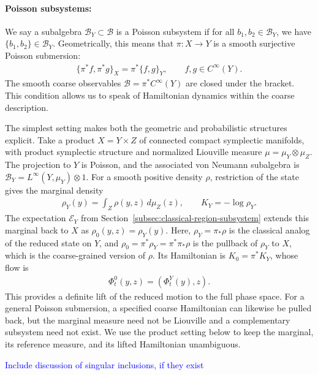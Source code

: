 \documentclass[a4paper,11pt]{article}
\theoremstyle{definition}
\newcommand{\mB}{\mathcal{B}}
\newcommand{\NL}[1]{\textcolor{blue}{#1}}
\newcommand{\mE}{\mathcal{E}}
\begin{document}
\paragraph{Poisson subsystems:} We say a subalgebra $\mB_Y\subset \mB$ is a Poisson subsystem if for all $b_1,b_2\in \mB_Y$, we have $\{b_1,b_2\}\in \mB_Y$. Geometrically, this means that $\pi:X\to Y$ is a smooth surjective Poisson submersion:
\begin{align}\label{eq:classical-Poisson-subsystem}
    \{\pi^*f,\pi^*g\}_X=\pi^*\{f,g\}_Y,
    \qquad f,g\in C^\infty(Y).
\end{align}
The smooth coarse observables $\mathcal B=\pi^*C^\infty(Y)$ are closed under the bracket. This condition allows us to speak of Hamiltonian dynamics within the coarse description.

The simplest setting makes both the geometric and probabilistic structures explicit. Take a product $X=Y\times Z$ of connected compact symplectic manifolds, with product symplectic structure and normalized Liouville measure $\mu=\mu_Y\otimes\mu_Z$. The projection to $Y$ is Poisson, and the associated von Neumann subalgebra is $\mB_Y=L^\infty(Y,\mu_Y)\otimes1$. For a smooth positive density $\rho$, restriction of the state gives the marginal density
\begin{align}\label{eq:classical-marginal-Hamiltonian}
    \rho_Y(y)=\int_Z\rho(y,z)\,d\mu_Z(z),\qquad
    K_Y=-\log\rho_Y.
\end{align}
The expectation $\mE_Y$ from Section~\ref{subsec:classical-region-subsystem} extends this marginal back to $X$ as $\rho_0(y,z)=\rho_Y(y)$. Here, $\rho_Y=\pi_*\rho$ is the classical analog of the reduced state on $Y$, and $\rho_0=\pi^*\rho_Y=\pi^*\pi_* \rho$ is the pullback of $\rho_Y$ to $X$, which is the coarse-grained version of $\rho$. Its Hamiltonian is $K_0=\pi^*K_Y$, whose flow is
\begin{align}
    \Phi_t^0(y,z)=(\Phi_t^Y(y),z).
\end{align}
This provides a definite lift of the reduced motion to the full phase space. For a general Poisson submersion, a specified coarse Hamiltonian can likewise be pulled back, but the marginal measure need not be Liouville and a complementary subsystem need not exist. We use the product setting below to keep the marginal, its reference measure, and its lifted Hamiltonian unambiguous.


\NL{Include discussion of singular inclusions, if they exist}
\end{document}
